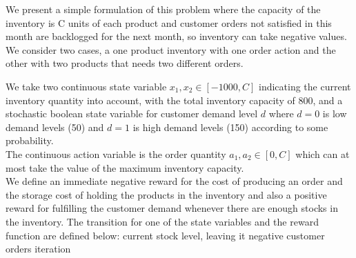 We present a simple formulation of this problem where the capacity of the
inventory is C units of each product and customer orders not satisfied in
this month are backlogged for the next month, so inventory can take negative
values. We consider two cases, a one product inventory with one order action
and the other with two products that needs two different orders.
 
We take two continuous state variable $x_1,x_2 \in [-1000,C]$ indicating the
current inventory quantity into account, with the total inventory capacity
of 800, and a stochastic boolean state variable for customer demand level
$d$ where $d=0$ is low demand levels (50) and $d=1$ is high demand levels
(150) according to some probability. \\
The continuous action variable is the order quantity $a_1,a_2 \in [0,C]$
which can at most take the value of the maximum inventory capacity. \\
 
We define an immediate negative reward for the cost of producing an order
and the storage cost of holding the products in the inventory and also a
positive reward for fulfilling the customer demand whenever there are enough
stocks in the inventory. The transition for one of the state variables and
the reward function are defined below:
current stock level, leaving it negative
customer orders
iteration
 
